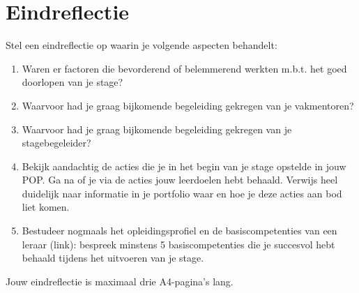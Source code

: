 \documentclass[a4paper,12pt,twoside]{article}%
\begin{document}
	
	
	
	
	
	
	

	
	
	
	
	
	
	
	
	\newpage
	\section{Eindreflectie}
	Stel een eindreflectie op waarin je volgende aspecten behandelt: 
	\begin{enumerate}
		\item Waren er factoren die bevorderend of belemmerend werkten m.b.t. het goed doorlopen van je stage? 
		\item Waarvoor had je graag bijkomende begeleiding gekregen van je vakmentoren? 
		\item Waarvoor had je graag bijkomende begeleiding gekregen van je stagebegeleider? 
		\item Bekijk aandachtig de acties die je in het begin van je stage opstelde in jouw POP. Ga na of je via de acties jouw leerdoelen hebt behaald. Verwijs heel duidelijk naar informatie in je portfolio waar en hoe je deze acties aan bod liet komen. 
		\item  Bestudeer nogmaals het opleidingsprofiel en de basiscompetenties van een leraar (link):  bespreek minstens 5 basiscompetenties die je succesvol hebt behaald tijdens het uitvoeren van je stage. 
	\end{enumerate} 
Jouw eindreflectie is maximaal drie A4-pagina’s lang.\newline\newline
	
\end{document}
